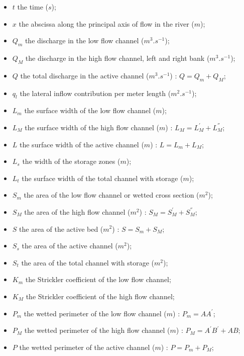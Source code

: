 \begin{itemize}
 \item $t$ the time ($s$);
 \item $x$ the abscissa along the principal axis of flow in the river ($m$); \newline

 \item $Q_m$ the discharge in the low flow channel ($m^3.s^{-1}$);
 \item $Q_M$ the discharge in the high flow channel, left and right bank ($m^3.s^{-1}$);
 \item $Q$ the total discharge in the active channel ($m^3.s^{-1}$) : $Q = Q_m + Q_M$;
 \item $q_l$ the lateral inflow contribution per meter length ($m^2.s^{-1}$); \newline

 \item $L_m$ the surface width of the low flow channel ($m$);
 \item $L_M$ the surface width of the high flow channel ($m$) : $L_M = L^{'}_{M} + L^{''}_M$;
 \item $L$ the surface width of the active channel ($m$) : $L = L_m + L_M$;
 \item $L_s$ the width of the storage zones ($m$);
 \item $L_t$ the surface width of the total channel with storage ($m$); \newline

 \item $S_m$ the area of the low flow channel or wetted cross section ($m^2$);
 \item $S_M$ the area of the high flow channel ($m^2$) : $S_M = S^{'}_{M} + S^{''}_M$;
 \item $S$ the area of the active bed ($m^2$) : $S = S_m + S_M$;
 \item $S_s$ the area of the active channel ($m^2$);
 \item $S_t$ the area of the total channel with storage ($m^2$); \newline

 \item $K_m$ the Strickler coefficient of the low flow channel;
 \item $K_M$ the Strickler coefficient of the high flow channel; \newline

 \item $P_m$ the wetted perimeter of the low flow channel ($m$) : $P_m = AA^{'}$;
 \item $P_M$ the wetted perimeter of the high flow channel ($m$) : $P_M = A^{'}B^{'}+AB$;
 \item $P$ the wetted perimeter of the active channel ($m$) : $P = P_m + P_M$; \newline


\end{itemize}
